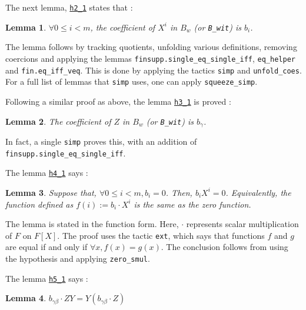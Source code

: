 \documentclass{article}
\newtheorem{lemma}{Lemma}
\theoremstyle{definition}
\theoremstyle{remark}
\begin{document}
The next lemma, \href{https://github.com/BoltonBailey/formal-snarks-project/blob/7fd9cd122f5887f88f6a706b4f2a68a7153c7381/src/snarks/babysnark/knowledge_soundness.lean#L223}{\texttt{h2\_1}} states that :
\theoremstyle{lemma} \label{h2_1}
\begin{lemma}
    $\forall 0 \le i < m$, the coefficient of $X^{i}$ in $B_{w}$ (or \texttt{B\_wit}) is $b_i$.
\end{lemma}

The lemma follows by tracking quotients, unfolding various definitions, removing coercions and applying the lemmas \texttt{finsupp.single\_eq\_single\_iff}, \texttt{eq\_helper} and \texttt{fin.eq\_iff\_veq}. This is done by applying the tactics 
\texttt{simp} and \texttt{unfold\_coes}. For a full list of lemmas that \texttt{simp} uses, one can apply \texttt{squeeze\_simp}.

Following a similar proof as above, the lemma \href{https://github.com/BoltonBailey/formal-snarks-project/blob/7fd9cd122f5887f88f6a706b4f2a68a7153c7381/src/snarks/babysnark/knowledge_soundness.lean#L244}{\texttt{h3\_1}} is proved : 
\theoremstyle{lemma} \label{h3_1}
\begin{lemma}
    The coefficient of $Z$ in $B_{w}$ (or \texttt{B\_wit}) is $b_{\gamma}$.
\end{lemma}

In fact, a single \texttt{simp} proves this, with an addition of \texttt{finsupp.single\_eq\_single\_iff}.

The lemma \href{https://github.com/BoltonBailey/formal-snarks-project/blob/7fd9cd122f5887f88f6a706b4f2a68a7153c7381/src/snarks/babysnark/knowledge_soundness.lean#L261}{\texttt{h4\_1}} says :
\theoremstyle{lemma}
\begin{lemma} \label{h4_1}
    Suppose that, $\forall 0 \le i < m, b_{i} = 0$. Then, $b_i X^i = 0$. Equivalently, the function defined as $f(i) := b_i \cdot X^i$ is the same as the zero function.
\end{lemma}

The lemma is stated in the function form. Here, $\cdot$ represents scalar multiplication of $F$ on $F[X]$.
The proof uses the tactic \texttt{ext}, which says that functions $f$ and $g$ are equal if and only if $\forall x, f(x) = g(x)$. The conclusion follows from 
using the hypothesis and applying \texttt{zero\_smul}.

The lemma \href{https://github.com/BoltonBailey/formal-snarks-project/blob/7fd9cd122f5887f88f6a706b4f2a68a7153c7381/src/snarks/babysnark/knowledge_soundness.lean#L272}{\texttt{h5\_1}} says :
\theoremstyle{lemma} \label{h5_1}
\begin{lemma}
    $b_{\gamma \beta} \cdot ZY = Y (b_{\gamma \beta} \cdot Z)$
\end{lemma}
\end{document}
